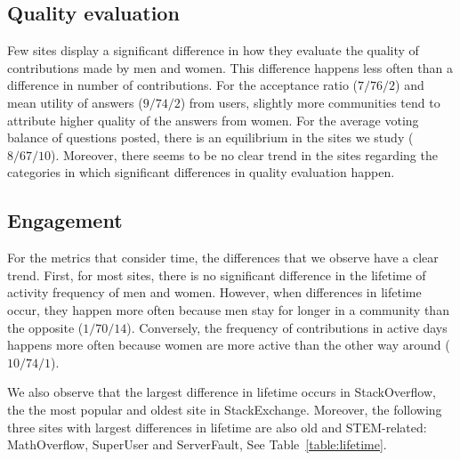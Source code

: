 \subsection{Quality evaluation} %
\label{subsec:qualidade}
Few sites display a significant difference in how they evaluate the quality of contributions made by men and women. This difference happens less often than a difference in number of contributions. For the acceptance ratio ($7/76/2$) and mean utility of answers ($9/74/2$) from users, slightly more communities tend to attribute higher quality of the answers from women. For the average voting balance of questions posted, there is an equilibrium in the sites we study ($8/67/10$). Moreover, there seems to be no clear trend in the sites regarding the categories in which significant differences in quality evaluation happen. 




\subsection{Engagement}%
For the metrics that consider time, the differences that we observe have a clear trend. First, for most sites, there is no significant difference in the lifetime of activity frequency of men and women. However, when differences in lifetime occur, they happen more often because men stay for longer in a community than the opposite ($1/70/14$). Conversely, the frequency of contributions in active days happens more often because women are more active than the other way around ($10/74/1$). 

We also observe that the largest difference in lifetime occurs in StackOverflow, the the most popular and oldest site in StackExchange. Moreover, the following three sites with largest differences in lifetime are also old and STEM-related: MathOverflow, SuperUser and ServerFault, See Table~\ref{table:lifetime}. 

